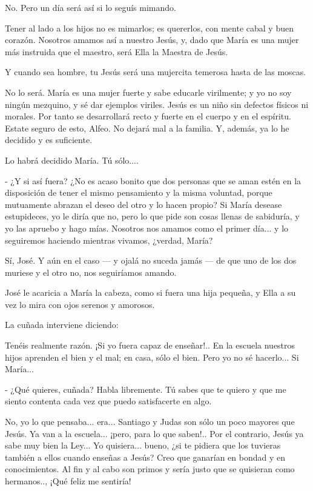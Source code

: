 \documentclass[12pt]{book} %
\begin{document}
No. Pero un día será así si lo seguís mimando. 

Tener al lado a los hijos no es mimarlos; es quererlos, con mente cabal y buen corazón. Nosotros amamos así a nuestro Jesús, y, dado que María es una mujer más instruida que el maestro, será Ella la Maestra de Jesús. 

Y cuando sea hombre, tu Jesús será una mujercita temerosa hasta de las moscas. 

No lo será. María es una mujer fuerte y sabe educarle virilmente; y yo no soy ningún mezquino, y sé dar ejemplos viriles. Jesús es un niño sin defectos físicos ni morales. Por tanto se desarrollará recto y fuerte en el cuerpo y en el espíritu. Estate seguro de esto, Alfeo. No dejará mal a la familia. Y, además, ya lo he decidido y es suficiente. 

Lo habrá decidido María. Tú sólo.... 

- ¿Y si así fuera? ¿No es acaso bonito que dos personas que se aman estén en la disposición de tener el mismo pensamiento y la misma voluntad, porque mutuamente abrazan el deseo del otro y lo hacen propio? Si María desease estupideces, yo le diría que no, pero lo que pide son cosas llenas de sabiduría, y yo las apruebo y hago mías. Nosotros nos amamos como el primer día... y lo seguiremos haciendo mientras vivamos, ¿verdad, María? 

Sí, José. Y aún en el caso — y ojalá no suceda jamás — de que uno de los dos muriese y el otro no, nos seguiríamos amando. 

José le acaricia a María la cabeza, como si fuera una hija pequeña, y Ella a su vez lo mira con ojos serenos y amorosos. 

La cuñada interviene diciendo: 

Tenéis realmente razón. ¡Si yo fuera capaz de enseñar!.. En la escuela nuestros hijos aprenden el bien y el mal; en casa, sólo el bien. Pero yo no sé hacerlo... Si María... 

- ¿Qué quieres, cuñada? Habla libremente. Tú sabes que te quiero y que me siento contenta cada vez que puedo satisfacerte en algo. 

No, yo lo que pensaba... era... Santiago y Judas son sólo un poco mayores que Jesús. Ya van a la escuela... ¡pero, para lo que saben!.. Por el contrario, Jesús ya sabe muy bien la Ley... Yo quisiera... bueno, ¿si te pidiera que los tuvieras también a ellos cuando enseñas a Jesús? Creo que ganarían en bondad y en conocimientos. Al fin y al cabo son primos y sería justo que se quisieran como hermanos.., ¡Qué feliz me sentiría! 
\end{document}

